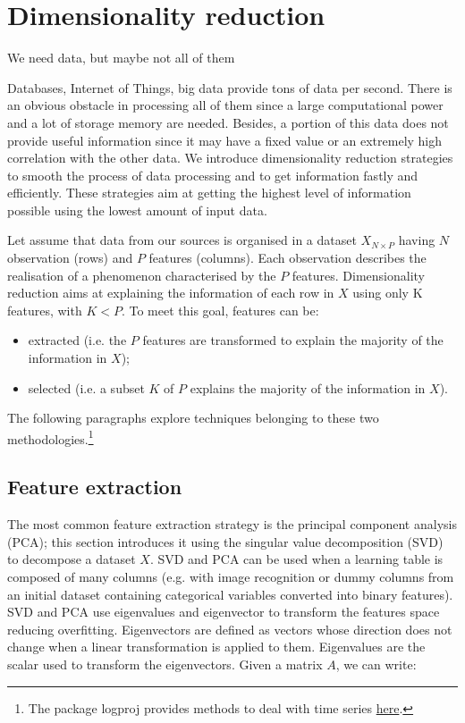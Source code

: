 \chapter{Dimensionality reduction}{We need data, but maybe not all of them}

Databases, Internet of Things, big data provide tons of data per second. There is an obvious obstacle in processing all of them since a large computational power and a lot of storage memory are needed. Besides, a portion of this data does not provide useful information since it may have a fixed value or an extremely high correlation with the other data. We introduce dimensionality reduction strategies to smooth the process of data processing and to get information fastly and efficiently. These strategies aim at getting the highest level of information possible using the lowest amount of input data.\par

Let assume that data from our sources is organised in a dataset $X_{N\times P}$ having $N$ observation (rows) and $P$ features (columns). Each observation describes the realisation of a phenomenon characterised by the $P$ features. Dimensionality reduction aims at explaining the information of each row in $X$ using only K features, with $K<P$. To meet this goal, features can be:

\begin{itemize}
    \item extracted (i.e. the $P$ features are transformed to explain the majority of the information in $X$);
    \item selected (i.e. a subset $K$ of $P$ explains the majority of the information in $X$). 
\end{itemize}

The following paragraphs explore techniques belonging to these two methodologies.\footnote{The package logproj provides methods to deal with time series \href{https://github.com/aletuf93/logproj/blob/master/logproj/ml_dimensionalityReduction.py}{here}.} 

\section{Feature extraction}
The most common feature extraction strategy is the principal component analysis (PCA); this section introduces it using the singular value decomposition (SVD) to decompose a dataset $X$. SVD and PCA can be used when a learning table is composed of many columns (e.g. with image recognition or dummy columns from an initial dataset containing categorical variables converted into binary features). SVD and PCA use eigenvalues and eigenvector to transform the features space reducing overfitting. Eigenvectors are defined as vectors whose direction does not change when a linear transformation is applied to them. Eigenvalues are the scalar used to transform the eigenvectors. Given a matrix $A$, we can write:


